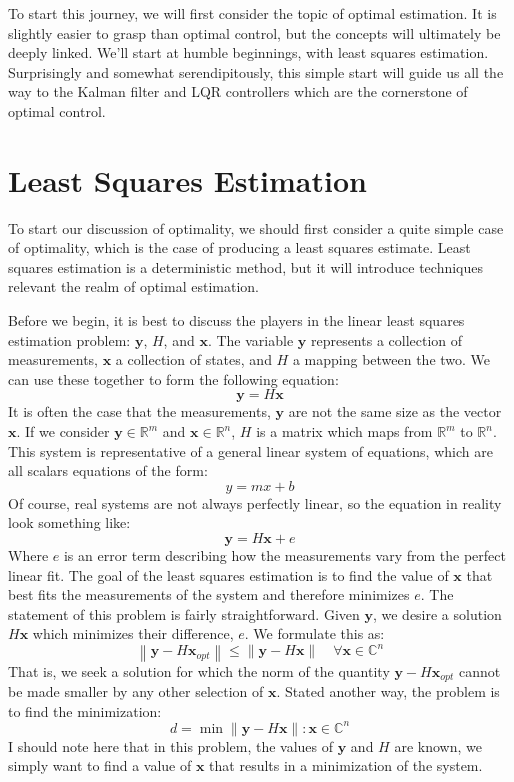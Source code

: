 To start this journey, we will first consider the topic of optimal estimation. It is slightly easier to grasp than optimal control, but the concepts will ultimately be deeply linked. We'll start at humble beginnings, with least squares estimation. Surprisingly and somewhat serendipitously, this simple start will guide us all the way to the Kalman filter and LQR controllers which are the cornerstone of optimal control. 


\section{Least Squares Estimation}\label{sec:least squares}
To start our discussion of optimality, we should first consider a quite simple case of optimality, which is the case of producing a least squares estimate. Least squares estimation is a deterministic method, but it will introduce techniques relevant the realm of optimal estimation.

Before we begin, it is best to discuss the players in the linear least squares estimation problem: $\bm{y}$, $H$, and $\bm{x}$. The variable $\bm{y}$ represents a collection of measurements, $\bm{x}$ a collection of states, and $H$ a mapping between the two. We can use these together to form the following equation:
$$\bm{y}=H\bm{x}$$
It is often the case that the measurements, $\bm{y}$ are not the same size as the vector $\bm{x}$. If we consider $\bm{y}\in\mathbb{R}^m$ and $\bm{x}\in\mathbb{R}^n$,  $H$ is a matrix which maps from $\mathbb{R}^m$ to $\mathbb{R}^n$. This system is representative of a general linear system of equations, which are all scalars equations of the form:
$$y=mx+b$$
Of course, real systems are not always perfectly linear, so the equation in reality look something like:
$$\bm{y}=H\bm{x}+e$$
Where $e$ is an error term describing how the measurements vary from the perfect linear fit. The goal of the least squares estimation is to find the value of $\bm{x}$ that best fits the measurements of the system and therefore minimizes $e$. The statement of this problem is fairly straightforward. Given $\bm{y}$, we desire a solution $H\bm{x}$ which minimizes their difference, $e$. We formulate this as:
$$\left\|\bm{y}-H\bm{x}_{opt}\right\|\leq\|\bm{y}-H\bm{x}\|\quad \forall \bm{x} \in \mathbb{C}^n$$
That is, we seek a solution for which the norm of the quantity $\bm{y}-H\bm{x}_{opt}$ cannot be made smaller by any other selection of $\bm{x}$. Stated another way, the problem is to find the minimization:
$$d=\min{\|\bm{y}-H\bm{x}\|:\bm{x} \in \mathbb{C}^n}$$
I should note here that in this problem, the values of $\bm{y}$ and $H$ are known, we simply want to find a value of $\bm{x}$ that results in a minimization of the system.

